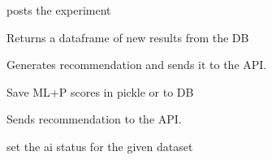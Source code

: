 \documentclass[letterpaper,10pt,english]{sphinxmanual}
\begin{document}
\begin{fulllineitems}

\begin{fulllineitems}
\label{\detokenize{index:ai.ai.AI.post_experiment}}
posts the experiment

\end{fulllineitems}


\begin{fulllineitems}
\label{\detokenize{index:ai.ai.AI.process_new_results}}
Returns a dataframe of new results from the DB

\end{fulllineitems}


\begin{fulllineitems}
\label{\detokenize{index:ai.ai.AI.process_rec}}
Generates recommendation and sends it to the API.

\end{fulllineitems}


\begin{fulllineitems}
\label{\detokenize{index:ai.ai.AI.save_state}}
Save ML+P scores in pickle or to DB

\end{fulllineitems}


\begin{fulllineitems}
\label{\detokenize{index:ai.ai.AI.send_rec}}
Sends recommendation to the API.

\end{fulllineitems}


\begin{fulllineitems}
\label{\detokenize{index:ai.ai.AI.set_ai_status}}
set the ai status for the given dataset


\end{fulllineitems}
\end{fulllineitems}
\end{document}
